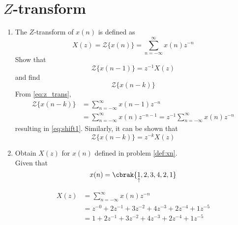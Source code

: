 \documentclass[journal,12pt,twocolumn]{IEEEtran}
\renewcommand\thesection{\arabic{section}}
\begin{document}
\section{$Z$-transform}
\begin{enumerate}[label=\thesection.\arabic*]
\item The $Z$-transform of $x(n)$ is defined as
%
\begin{equation}
\label{eq:z_trans}
X(z)={\mathcal {Z}}\{x(n)\}=\sum _{n=-\infty }^{\infty }x(n)z^{-n}
\end{equation}
%
Show that
\begin{equation}
\label{eq:shift1}
{\mathcal {Z}}\{x(n-1)\} = z^{-1}X(z)
\end{equation}
and find
\begin{equation}
	{\mathcal {Z}}\{x(n-k)\} 
\end{equation}
\solution From \eqref{eq:z_trans},
\begin{align}
{\mathcal {Z}}\{x(n-k)\} &=\sum _{n=-\infty }^{\infty }x(n-1)z^{-n}
\\
&=\sum _{n=-\infty }^{\infty }x(n)z^{-n-1} = z^{-1}\sum _{n=-\infty }^{\infty }x(n)z^{-n}
\end{align}
resulting in \eqref{eq:shift1}. Similarly, it can be shown that
%
\begin{equation}
\label{eq:z_trans_shift}
	{\mathcal {Z}}\{x(n-k)\} = z^{-k}X(z)
\end{equation}
\item Obtain $X(z)$ for $x(n)$ defined in problem 
	\ref{def:xn}.
\solution
\\Given that\\
\begin{equation}
	x(n) = \cbrak{\underset{\uparrow}{1},2,3,4,2,1}
\end{equation}

\begin{align}
	X(z) &= \sum _{n= -\infty}^{\infty}x(n)z^{-n}
	\\&=z^{-0}+2z^{-1}+3z^{-2}+4z^{-3}+2z^{-4}+1z^{-5}
	\\&= 1+2z^{-1}+3z^{-2}+4z^{-3}+2z^{-4}+1z^{-5}
\end{align}


\end{enumerate}
\end{document}
